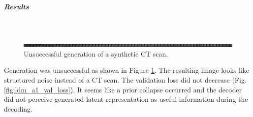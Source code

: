\subparagraph{Results}\mbox{}\\

\begin{figure}[H]
\includegraphics[width=\linewidth]{detailed_engineering/Monai Diffusion - Attempt 1/charts/generation.png}
\caption{Unsuccessful generation of a synthetic CT scan.}
\label{fig:attempt1-generation}
\end{figure}

\indent Generation was unsuccessful as shown in Figure \ref{fig:attempt1-generation}. The resulting image looks like structured noise instead of a CT scan. The validation loss did not decrease (Fig. \ref{fig:ldm_a1_val_loss}). It seems like a prior collapse occurred and the decoder did not perceive generated latent representation as useful information during the decoding.
